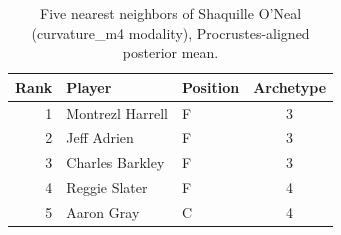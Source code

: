 \begin{table}[htbp]
  \centering\small
  \begin{tabular}{rllc}
    \toprule
    Rank & Player & Position & Archetype \\
    \midrule
    1 & Montrezl Harrell & F & 3 \\
    2 & Jeff Adrien & F & 3 \\
    3 & Charles Barkley & F & 3 \\
    4 & Reggie Slater & F & 4 \\
    5 & Aaron Gray & C & 4 \\
    \bottomrule
  \end{tabular}
  \caption{Five nearest neighbors of Shaquille O'Neal (curvature_m4 modality), Procrustes-aligned posterior mean.}
  \label{tab:Shaquille_O_Neal_neighbors_curvature_m4}
\end{table}

